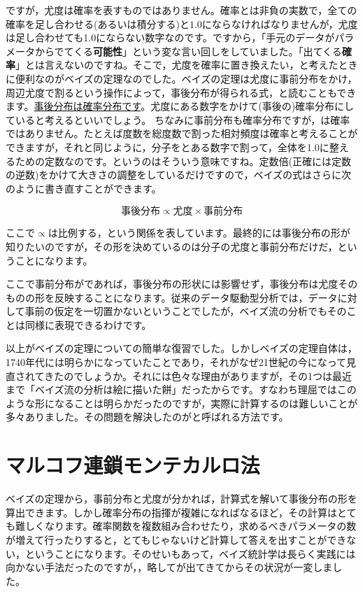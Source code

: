\documentclass{ltjsbook}
\begin{document}
ですが，尤度は確率を表すものではありません。確率とは非負の実数で，全ての確率を足し合わせる(あるいは積分する)と$1.0$にならなければなりませんが，尤度は足し合わせても1.0にならない数字なのです。ですから，「手元のデータがパラメータからでてくる\textbf{可能性}」という変な言い回しをしていました。「出てくる\textbf{確率}」とは言えないのですね。そこで，尤度を確率に置き換えたい，と考えたときに便利なのがベイズの定理なのでした。ベイズの定理は尤度に事前分布をかけ，周辺尤度で割るという操作によって，事後分布が得られる式，と読むこともできます。\underline{事後分布は確率分布です}。尤度にある数字をかけて(事後の)確率分布にしていると考えるといいでしょう。
ちなみに事前分布も確率分布ですが，は確率ではありません。たとえば度数を総度数で割った相対頻度は確率と考えることができますが，それと同じように，分子をとある数字で割って，全体を1.0に整えるための定数なのです。というのはそういう意味ですね。定数倍(正確には定数の逆数)をかけて大きさの調整をしているだけですので，ベイズの式はさらに次のように書き直すことができます。

$$ \mbox{事後分布} \propto \mbox{尤度}\times \mbox{事前分布} $$

ここで$\propto$は比例する，という関係を表しています。最終的には事後分布の形が知りたいのですが，その形を決めているのは分子の尤度と事前分布だけだ，ということになります。

ここで事前分布がであれば，事後分布の形状には影響せず，事後分布は尤度そのものの形を反映することになります。従来のデータ駆動型分析では，データに対して事前の仮定を一切置かないということでしたが，ベイズ流の分析でもそのことは同様に表現できるわけです。

以上がベイズの定理についての簡単な復習でした。しかしベイズの定理自体は，1740年代には明らかになっていたことであり，それがなぜ21世紀の今になって見直されてきたのでしょうか。それには色々な理由がありますが，その1つは最近まで「ベイズ流の分析は絵に描いた餅」だったからです。すなわち理屈ではこのような形になることは明らかだったのですが，実際に計算するのは難しいことが多々ありました。その問題を解決したのがと呼ばれる方法です。

\section{マルコフ連鎖モンテカルロ法}
\label{MCMC}
ベイズの定理から，事前分布と尤度が分かれば，計算式を解いて事後分布の形を算出できます。しかし確率分布の指揮が複雑になればなるほど，その計算はとても難しくなります。確率関数を複数組み合わせたり，求めるべきパラメータの数が増えて行ったりすると，とてもじゃないけど計算して答えを出すことができない，ということになります。そのせいもあって，ベイズ統計学は長らく実践には向かない手法だったのですが，，略してが出てきてからその状況が一変しました。
\end{document}
